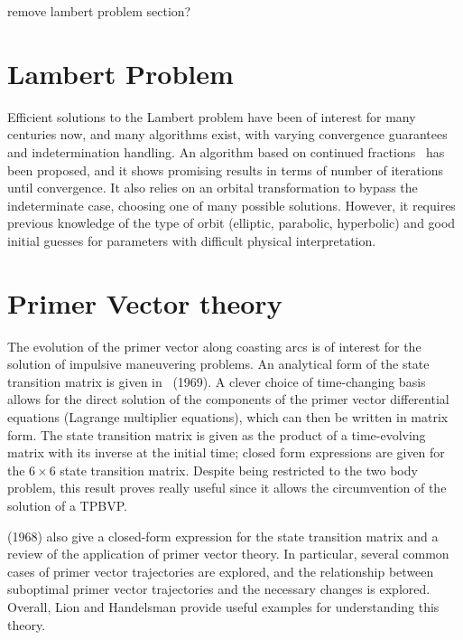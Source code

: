 remove lambert problem section?

\section{Lambert Problem}

Efficient solutions to the Lambert problem have been of interest for many centuries now, and many algorithms exist, with varying convergence guarantees and indetermination handling. An algorithm based on continued fractions~\cite{battin_vaughan_elegant_lambert} has been proposed, and it shows promising results in terms of number of iterations until convergence. It also relies on an orbital transformation to bypass the indeterminate case, choosing one of many possible solutions. However, it requires previous knowledge of the type of orbit (elliptic, parabolic, hyperbolic) and good initial guesses for parameters with difficult physical interpretation. 

\section{Primer Vector theory}

The evolution of the primer vector along coasting arcs is of interest for the solution of impulsive maneuvering problems. An analytical form of the state transition matrix is given in~\citeauthor{glandorf_transition_matrix} (1969). A clever choice of time-changing basis allows for the direct solution of the components of the primer vector differential equations (Lagrange multiplier equations), which can then be written in matrix form. The state transition matrix is given as the product of a time-evolving matrix with its inverse at the initial time; closed form expressions are given for the \(6\times6\) state transition matrix. Despite being restricted to the two body problem, this result proves really useful since it allows the circumvention of the solution of a TPBVP.

\citeauthor{fixed_time_primer_vector} (1968) also give a closed-form expression for the state transition matrix and a review of the application of primer vector theory. In particular, several common cases of primer vector trajectories are explored, and the relationship between suboptimal primer vector trajectories and the necessary changes is explored. Overall, Lion and Handelsman provide useful examples for understanding this theory. 

